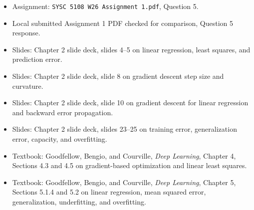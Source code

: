 \documentclass[11pt]{article}
\begin{document}
\begin{itemize}
\item Assignment: \texttt{SYSC 5108 W26 Assignment 1.pdf}, Question 5.
\item Local submitted Assignment 1 PDF checked for comparison, Question 5 response.
\item Slides: Chapter 2 slide deck, slides 4--5 on linear regression, least squares, and prediction error.
\item Slides: Chapter 2 slide deck, slide 8 on gradient descent step size and curvature.
\item Slides: Chapter 2 slide deck, slide 10 on gradient descent for linear regression and backward error propagation.
\item Slides: Chapter 2 slide deck, slides 23--25 on training error, generalization error, capacity, and overfitting.
\item Textbook: Goodfellow, Bengio, and Courville, \textit{Deep Learning}, Chapter 4, Sections 4.3 and 4.5 on gradient-based optimization and linear least squares.
\item Textbook: Goodfellow, Bengio, and Courville, \textit{Deep Learning}, Chapter 5, Sections 5.1.4 and 5.2 on linear regression, mean squared error, generalization, underfitting, and overfitting.
\end{itemize}
\end{document}
